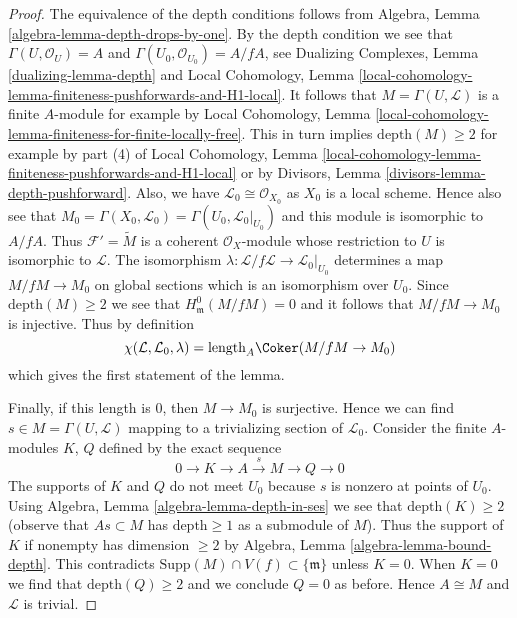 \begin{proof}
The equivalence of the depth conditions follows from
Algebra, Lemma \ref{algebra-lemma-depth-drops-by-one}.
By the depth condition we see that
$\Gamma(U, \mathcal{O}_U) = A$ and
$\Gamma(U_0, \mathcal{O}_{U_0}) = A/fA$, see
Dualizing Complexes, Lemma \ref{dualizing-lemma-depth} and
Local Cohomology, Lemma
\ref{local-cohomology-lemma-finiteness-pushforwards-and-H1-local}.
It follows that $M = \Gamma(U, \mathcal{L})$ is a finite $A$-module
for example by Local Cohomology, Lemma
\ref{local-cohomology-lemma-finiteness-for-finite-locally-free}.
This in turn implies $\text{depth}(M) \geq 2$ for example by
part (4) of Local Cohomology, Lemma
\ref{local-cohomology-lemma-finiteness-pushforwards-and-H1-local}
or by Divisors, Lemma \ref{divisors-lemma-depth-pushforward}.
Also, we have $\mathcal{L}_0 \cong \mathcal{O}_{X_0}$
as $X_0$ is a local scheme. Hence also see that
$M_0 = \Gamma(X_0, \mathcal{L}_0) = \Gamma(U_0, \mathcal{L}_0|_{U_0})$
and this module is isomorphic to $A/fA$.
Thus $\mathcal{F}' = \widetilde{M}$ is a coherent $\mathcal{O}_X$-module
whose restriction to $U$ is isomorphic to $\mathcal{L}$.
The isomorphism
$\lambda : \mathcal{L}/f\mathcal{L} \to \mathcal{L}_0|_{U_0}$
determines a map $M/fM \to M_0$ on global sections
which is an isomorphism over $U_0$.
Since $\text{depth}(M) \geq 2$ we see
that $H^0_\mathfrak m(M/fM) = 0$ and it follows that
$M/fM \to M_0$ is injective. Thus by definition
$$
\chi(\mathcal{L}, \mathcal{L}_0, \lambda) =
\text{length}_A \Coker(M/fM \to M_0)
$$
which gives the first statement of the lemma.

\medskip\noindent
Finally, if this length is $0$, then $M \to M_0$ is surjective.
Hence we can find $s \in M = \Gamma(U, \mathcal{L})$
mapping to a trivializing section of $\mathcal{L}_0$.
Consider the finite $A$-modules $K$, $Q$ defined by the exact
sequence
$$
0 \to K \to A \xrightarrow{s} M \to Q \to 0
$$
The supports of $K$ and $Q$ do not meet $U_0$ because $s$
is nonzero at points of $U_0$. Using
Algebra, Lemma \ref{algebra-lemma-depth-in-ses}
we see that $\text{depth}(K) \geq 2$ (observe that
$As \subset M$ has $\text{depth} \geq 1$ as a submodule of $M$).
Thus the support of $K$ if nonempty has dimension $\geq 2$ by
Algebra, Lemma \ref{algebra-lemma-bound-depth}.
This contradicts $\text{Supp}(M) \cap V(f) \subset \{\mathfrak m\}$
unless $K = 0$. When $K = 0$ we find that
$\text{depth}(Q) \geq 2$ and we conclude
$Q = 0$ as before. Hence $A \cong M$ and
$\mathcal{L}$ is trivial.
\end{proof}







